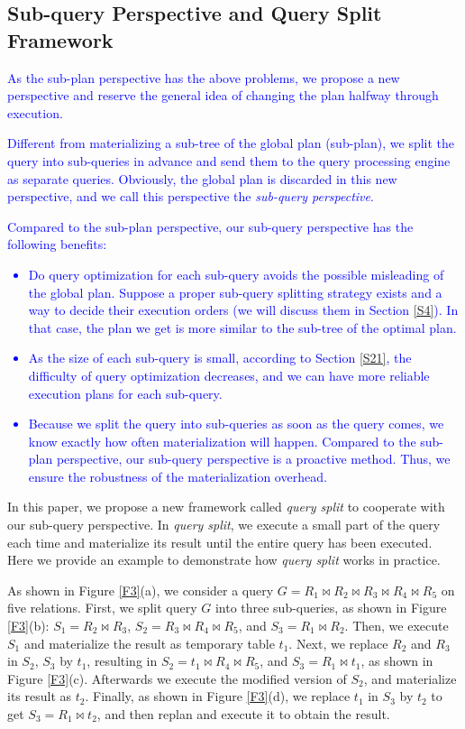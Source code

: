 \subsection{Sub-query Perspective and Query Split Framework} \label{S24}
\textcolor{blue}{
    As the sub-plan perspective has the above problems, we propose a new perspective and reserve the general idea of changing the plan halfway through execution.
}\par
\textcolor{blue}{
    Different from materializing a sub-tree of the global plan (sub-plan), we split the query into sub-queries in advance and send them to the query processing engine as separate queries. Obviously, the global plan is discarded in this new perspective, and we call this perspective the \textit{sub-query perspective}.
}\par
\textcolor{blue}{
    Compared to the sub-plan perspective, our sub-query perspective has the following benefits:
    \begin{itemize}[leftmargin = 15pt]
        \item Do query optimization for each sub-query avoids the possible misleading of the global plan. Suppose a proper sub-query splitting strategy exists and a way to decide their execution orders (we will discuss them in Section \ref{S4}). In that case, the plan we get is more similar to the sub-tree of the optimal plan.
        \item As the size of each sub-query is small, according to Section \ref{S21}, the difficulty of query optimization decreases, and we can have more reliable execution plans for each sub-query.
        \item Because we split the query into sub-queries as soon as the query comes, we know exactly how often materialization will happen. Compared to the sub-plan perspective, our sub-query perspective is a proactive method. Thus, we ensure the robustness of the materialization overhead.
    \end{itemize}
}\par
    In this paper, we propose a new framework called \textit{query split} to cooperate with our sub-query perspective. In \textit{query split}, we execute a small part of the query each time and materialize its result until the entire query has been executed. Here we provide an example to demonstrate how \textit{query split} works in practice.
    \begin{Example}
        As shown in Figure \ref{F3}(a), we consider a query $G=R_1 \bowtie R_2 \bowtie R_3 \bowtie R_4 \bowtie R_5$ on five relations. First, we split query $G$ into three sub-queries, as shown in Figure \ref{F3}(b): $S_1=R_2 \bowtie R_3$, $S_2=R_3 \bowtie R_4 \bowtie R_5$, and $S_3=R_1 \bowtie R_2$. Then, we execute $S_1$ and materialize the result as temporary table $t_1$. Next, we replace $R_2$ and $R_3$ in $S_2$, $S_3$ by $t_1$, resulting in $S_2=t_1 \bowtie R_4 \bowtie R_5$, and $S_3=R_1 \bowtie t_1$, as shown in Figure \ref{F3}(c). Afterwards we execute the modified version of $S_2$, and materialize its result as $t_2$. Finally, as shown in Figure \ref{F3}(d), we replace $t_1$ in $S_3$ by $t_2$ to get $S_3=R_1 \bowtie t_2$, and then replan and execute it to obtain the result.
    \end{Example}
